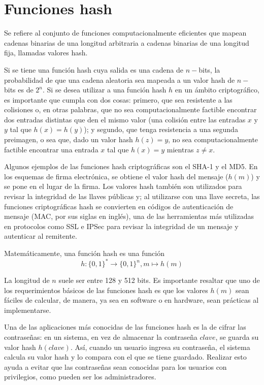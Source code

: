 %
%
\newpage
\section{Funciones hash}

Se refiere al conjunto de funciones computacionalmente eficientes que
mapean cadenas binarias de una longitud arbitraria a cadenas binarias
de una longitud fija, llamadas valores hash.

Si se tiene una función hash cuya salida es una cadena de $n-$bits, 
la probabilidad de que una cadena aleatoria
sea mapeada a un valor hash de $n-$bits es de $2^n$. Si se desea utilizar
a una función hash $h$ en un ámbito criptográfico, es importante que 
cumpla con dos cosas: primero, que sea resistente a las colisiones o, 
en otras palabras, que no sea computacionalmente factible encontrar dos entradas distintas que den el mismo valor (una colisión entre las entradas $x$ y $y$ tal que $h(x) = h(y)$); y segundo, que tenga resistencia a una segunda preimagen, o sea que, dado un valor hash $h(z) = y$, no sea computacionalmente factible encontrar una entrada $x$ tal que $h(x) = y$ mientras $z \neq x$.

Algunos ejemplos de las funciones hash criptográficas son el SHA-1 y el 
MD5. En los esquemas de firma electrónica, se obtiene el valor hash del
mensaje ($h(m)$) y se pone en el lugar de la firma. Los valores hash 
también son utilizados para revisar la integridad de las llaves públicas 
y; al utilizarse con una llave secreta, las funciones criptográficas hash
se convierten en códigos de autenticación de mensaje (MAC, por sus siglas
en inglés), una de las herramientas más utilizadas en protocolos como SSL
e IPSec para revisar la integridad de un mensaje y autenticar al 
remitente.

Matemáticamente, una función hash es una función
\begin{equation}
  \label{funcion_hash_def}
 	h: \{0, 1\}^* \longrightarrow \{0,1\}^n, m \longmapsto h(m)
\end{equation}

La longitud de $n$ suele ser entre 128 y 512 bits. 
Es importante resaltar que uno de los requerimientos básicos de las
funciones hash es que los valores $h(m)$ sean fáciles de calcular, 
de manera, ya sea en software o en hardware, sean prácticas al 
implementarse. 

Una de las aplicaciones más conocidas de las funciones hash es la de
cifrar las contraseñas: en un sistema, en vez de almacenar la contraseña
$clave$, se guarda su valor hash $h(clave)$. Así, cuando un usuario 
ingresa su contraseña, el sistema calcula su valor hash y lo compara con
el que se tiene guardado. Realizar esto ayuda a evitar que las contraseñas
sean conocidas para los usuarios con privilegios, como pueden ser los 
administradores.

